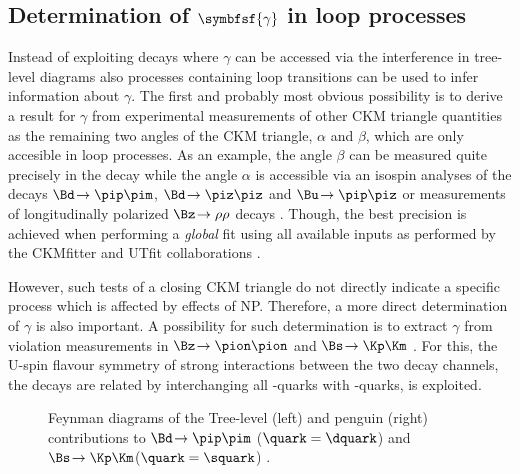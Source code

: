 \subsection[head={Determination of $\gamma$ in loop processes},tocentry={Determination of $\gamma$ in loop processes}]{Determination of $\symbfsf{\gamma}$ in loop processes}
\label{sec:gamamInLoops}

Instead of exploiting decays where $\gamma$ can be accessed via the interference in tree-level diagrams also processes containing loop transitions can be used to infer information about $\gamma$.
The first and probably most obvious possibility is to derive a result for $\gamma$ from experimental measurements of other CKM triangle quantities as the remaining two angles of the CKM triangle, $\alpha$ and $\beta$, which are only accesible in loop processes.
As an example, the angle $\beta$ can be measured quite precisely in the decay \mbox{\BdToJPsiKS} while the angle $\alpha$ is accessible via an isospin analyses of the decays $\Bd\!\to\pip\pim$, $\Bd\!\to\piz\piz$ and $\Bu\!\to\pip\piz$ \cite{IsospinAlpha} or measurements of longitudinally polarized $\Bz\!\to\rho\rho$ decays \cite{alpha_BaBar, alpha_Belle}. Though, the best precision is achieved when performing a \emph{global} fit using all available inputs as performed by the CKMfitter and UTfit collaborations \cite{CKMfitter2015, UTfit-UT}.

However, such tests of a closing CKM triangle do not directly indicate a specific process which is affected by effects of \acf{NP}.
Therefore, a more direct determination of $\gamma$ is also important.
A possibility for such determination is to extract $\gamma$ from \mbox{\CP violation} measurements in $\Bz\!\to\pion\pion$ and $\Bs\!\to\Kp\Km$ \cite{GammaInLoops_Fleischer, GammaInLoops_Ciuchini}.
For this, the U-spin flavour symmetry of strong interactions between the two decay channels, \ie the decays are related by interchanging all \dquark-quarks with \squark-quarks, is exploited.
\begin{figure}[tbp]
	\centering
	
	\hfill
	
	\caption{Feynman diagrams of the Tree-level (left) and penguin (right) contributions to $\Bd\!\to\pip\pim$ ($\quark=\dquark$) and $\Bs\!\to\Kp\Km$($\quark=\squark$) \cite{Ellis:2016jkw}.}
	\label{fig:feynmanGammaLoops}
\end{figure}

